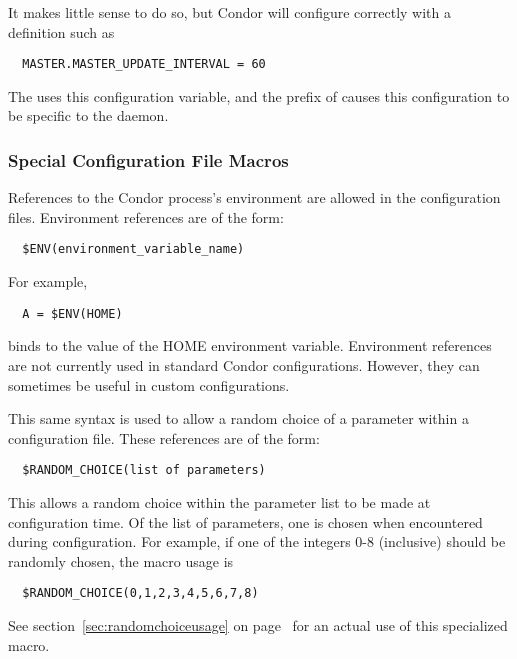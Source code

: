 It makes little sense to do so, but Condor will configure
correctly with a definition such as
\begin{verbatim}
  MASTER.MASTER_UPDATE_INTERVAL = 60
\end{verbatim}
The  uses this configuration variable,
and the prefix of  causes this configuration
to be specific to the  daemon.

\subsubsection{\label{sec:Config-File-Special}Special Configuration
  File Macros} 

References to the Condor process's environment are allowed in the
configuration files.
Environment references are of the form:
\begin{verbatim}
  $ENV(environment_variable_name)
\end{verbatim}
For example, 
\begin{verbatim}
  A = $ENV(HOME)
\end{verbatim}
binds  to the value of the HOME environment variable.
Environment references are not currently used in standard Condor
configurations.
However, they can sometimes be useful in custom configurations.

This same syntax is used to allow a random choice of a parameter
within a configuration file.
These references are of the form:
\begin{verbatim}
  $RANDOM_CHOICE(list of parameters)
\end{verbatim}
This allows a random choice within the parameter list to be made
at configuration time.  Of the list of parameters, one is
chosen when encountered during configuration.  For example,
if one of the integers 0-8 (inclusive) should be randomly
chosen, the macro usage is
\begin{verbatim}
  $RANDOM_CHOICE(0,1,2,3,4,5,6,7,8)
\end{verbatim}
See section~\ref{sec:randomchoiceusage} on
page~\pageref{sec:randomchoiceusage}
for an actual use of this specialized macro.

